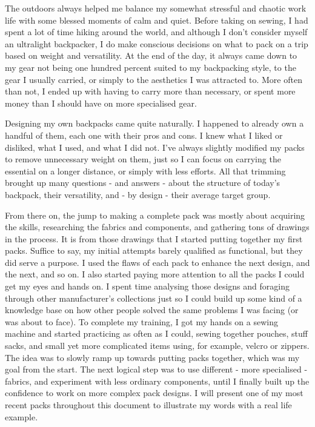 
The outdoors always helped me balance my somewhat stressful and chaotic work life with some blessed moments of calm and quiet. Before taking on sewing, I had spent a lot of time hiking around the world, and although I don't consider myself an ultralight backpacker, I do make conscious decisions on what to pack on a trip based on weight and versatility. At the end of the day, it always came down to my gear not being one hundred percent suited to my backpacking style, to the gear I usually carried, or simply to the aesthetics I was attracted to. More often than not, I ended up with having to carry more than necessary, or spent more money than I should have on more specialised gear.

Designing my own backpacks came quite naturally. I happened to already own a handful of them, each one with their pros and cons. I knew what I liked or disliked, what I used, and what I did not. I've always slightly modified my packs to remove unnecessary weight on them, just so I can focus on carrying the essential on a longer distance, or simply with less efforts. All that trimming brought up many questions - and answers - about the structure of today's backpack, their versatility, and - by design - their average target group.

From there on, the jump to making a complete pack was mostly about acquiring the skills, researching the fabrics and components, and gathering tons of drawings in the process. It is from those drawings that I started putting together my first packs. Suffice to say, my initial attempts barely qualified as functional, but they did serve a purpose. I used the flaws of each pack to enhance the next design, and the next, and so on. I also started paying more attention to all the packs I could get my eyes and hands on. I spent time analysing those designs and foraging through other manufacturer's collections just so I could build up some kind of a knowledge base on how other people solved the same problems I was facing (or was about to face). To complete my training, I got my hands on a sewing machine and started practicing as often as I could, sewing together pouches, stuff sacks, and small yet more complicated items using, for example, velcro or zippers. The idea was to slowly ramp up towards putting packs together, which was my goal from the start. The next logical step was to use different - more specialised - fabrics, and experiment with less ordinary components, until I finally built up the confidence to work on more complex pack designs. I will present one of my most recent packs throughout this document to illustrate my words with a real life example.

